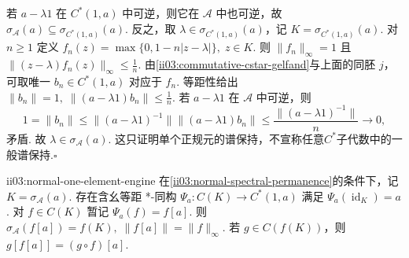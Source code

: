 \begin{FAProof}
若 \(\displaystyle a-\lambda1\) 在 \(\displaystyle C^*(1,a)\) 中可逆，则它在 \(\displaystyle\mathcal A\) 中也可逆，故
\(\displaystyle \sigma_{\mathcal A}(a)\subseteq\sigma_{C^*(1,a)}(a).\)
反之，取 \(\displaystyle\lambda\in\sigma_{C^*(1,a)}(a)\)，记 \(\displaystyle K=\sigma_{C^*(1,a)}(a)\). 对 \(\displaystyle n\geqslant1\) 定义
\(\displaystyle f_n(z)=\max\{0,1-n|z-\lambda|\}, \; z\in K.\)
则 \(\displaystyle\|f_n\|_\infty=1\) 且
\(\displaystyle \|(z-\lambda)f_n(z)\|_\infty\leqslant\frac1n.\)
由\autoref{ii03:commutative-cstar-gelfand}与上面的同胚 \(\displaystyle j\)，可取唯一 \(\displaystyle b_n\in C^*(1,a)\) 对应于 \(\displaystyle f_n\). 等距性给出
\(\displaystyle \|b_n\|=1, \; \|(a-\lambda1)b_n\|\leqslant\frac1n.\)
若 \(\displaystyle a-\lambda1\) 在 \(\displaystyle\mathcal A\) 中可逆，则
\[
1=\|b_n\|
\leqslant\|(a-\lambda1)^{-1}\|\|(a-\lambda1)b_n\|
\leqslant\frac{\|(a-\lambda1)^{-1}\|}{n}
\longrightarrow0,
\]
矛盾. 故 \(\displaystyle\lambda\in\sigma_{\mathcal A}(a)\). 这只证明单个正规元的谱保持，不宣称任意\(\displaystyle C^*\)子代数中的一般谱保持.\hfill\(\square\)
\end{FAProof}

\begin{FAProposition}[B][单个正规元的局部函数演算引擎]{ii03:normal-one-element-engine}
在\autoref{ii03:normal-spectral-permanence}的条件下，记 \(\displaystyle K=\sigma_{\mathcal A}(a)\). 存在含幺等距 *-同构
\(\displaystyle \Psi_a:C(K)\longrightarrow C^*(1,a)\)
满足 \(\displaystyle\Psi_a(\operatorname{id}_K)=a\). 对 \(\displaystyle f\in C(K)\) 暂记 \(\displaystyle\Psi_a(f)=f[a]\). 则
\(\displaystyle \sigma_{\mathcal A}(f[a])=f(K), \; \|f[a]\|=\|f\|_\infty.\)
若 \(\displaystyle g\in C(f(K))\)，则
\(\displaystyle g[f[a]]=(g\circ f)[a].\)
\end{FAProposition}

